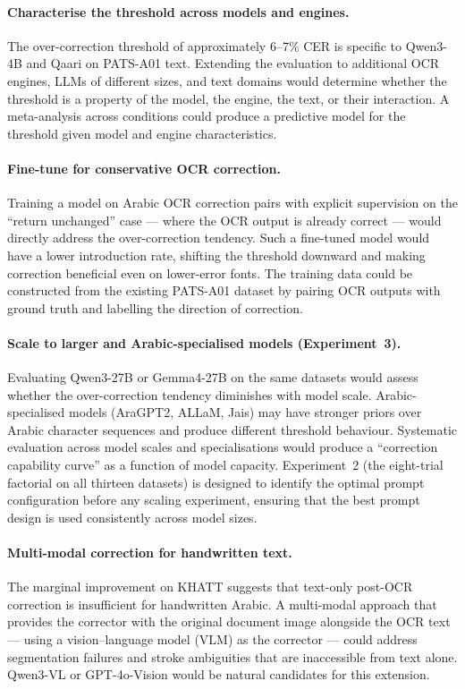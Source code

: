 \paragraph{Characterise the threshold across models and engines.}
The over-correction threshold of approximately 6--7\% CER is specific to
Qwen3-4B and Qaari on PATS-A01 text. Extending the evaluation to additional
OCR engines, LLMs of different sizes, and text domains would determine
whether the threshold is a property of the model, the engine, the text, or
their interaction. A meta-analysis across conditions could produce a
predictive model for the threshold given model and engine characteristics.

\paragraph{Fine-tune for conservative OCR correction.}
Training a model on Arabic OCR correction pairs with explicit supervision on
the ``return unchanged'' case --- where the OCR output is already correct ---
would directly address the over-correction tendency. Such a fine-tuned model
would have a lower introduction rate, shifting the threshold downward and
making correction beneficial even on lower-error fonts. The training data
could be constructed from the existing PATS-A01 dataset by pairing OCR
outputs with ground truth and labelling the direction of correction.

\paragraph{Scale to larger and Arabic-specialised models (Experiment~3).}
Evaluating Qwen3-27B or Gemma4-27B on the same datasets would assess whether
the over-correction tendency diminishes with model scale. Arabic-specialised
models (AraGPT2, ALLaM, Jais) may have stronger priors over Arabic character
sequences and produce different threshold behaviour. Systematic evaluation
across model scales and specialisations would produce a ``correction capability
curve'' as a function of model capacity.
Experiment~2 (the eight-trial factorial on all thirteen datasets) is designed
to identify the optimal prompt configuration before any scaling experiment,
ensuring that the best prompt design is used consistently across model sizes.

\paragraph{Multi-modal correction for handwritten text.}
The marginal improvement on KHATT suggests that text-only post-OCR correction
is insufficient for handwritten Arabic. A multi-modal approach that provides
the corrector with the original document image alongside the OCR text ---
using a vision--language model (VLM) as the corrector --- could address
segmentation failures and stroke ambiguities that are inaccessible from text
alone. Qwen3-VL or GPT-4o-Vision would be natural candidates for this extension.

